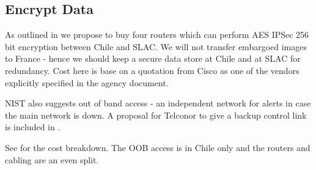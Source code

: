\subsection{Encrypt Data} \label{sec:1encrypt}

As outlined in   we propose to buy four routers which can perform AES IPSec 256 bit encryption between Chile and SLAC.
We will not transfer embargoed images to France - hence we should keep a secure data store at Chile and at SLAC for redundancy.
Cost here is base on a quotation from Cisco as one of the vendors explicitly specified in the agency document.

NIST also suggests out of band access - an independent network for alerts in case the main network is down.
A proposal for Telconor to give a backup control link is included in .

See  for the cost breakdown.  The OOB access is in Chile only and the routers and cabling are an even split.



